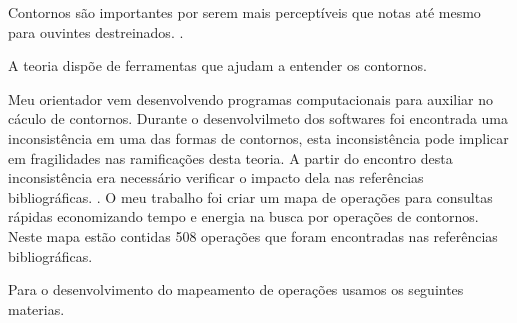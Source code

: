 \documentclass[11pt]{article}
\begin{document}
Contornos são importantes por serem mais perceptíveis que notas 
até mesmo para ouvintes destreinados.
\cite[p. 225]{Marvin1987}.

A teoria dispõe de ferramentas que ajudam a entender os contornos.


Meu orientador vem desenvolvendo programas computacionais para auxiliar no
cáculo de contornos. Durante o desenvolvilmeto dos softwares foi encontrada
uma inconsistência em uma das formas de contornos, esta inconsistência pode 
implicar em fragilidades nas ramificações desta teoria.
A partir do encontro desta inconsistência era necessário verificar o
impacto dela nas referências bibliográficas. .
O meu trabalho foi criar um mapa de operações para consultas rápidas 
economizando tempo e energia na busca por operações de contornos. 
Neste mapa estão contidas 508 operações que foram encontradas nas referências 
bibliográficas.


\label{sec:materiais}

Para o desenvolvimento do mapeamento de operações usamos os seguintes
materias.

\end{document}
